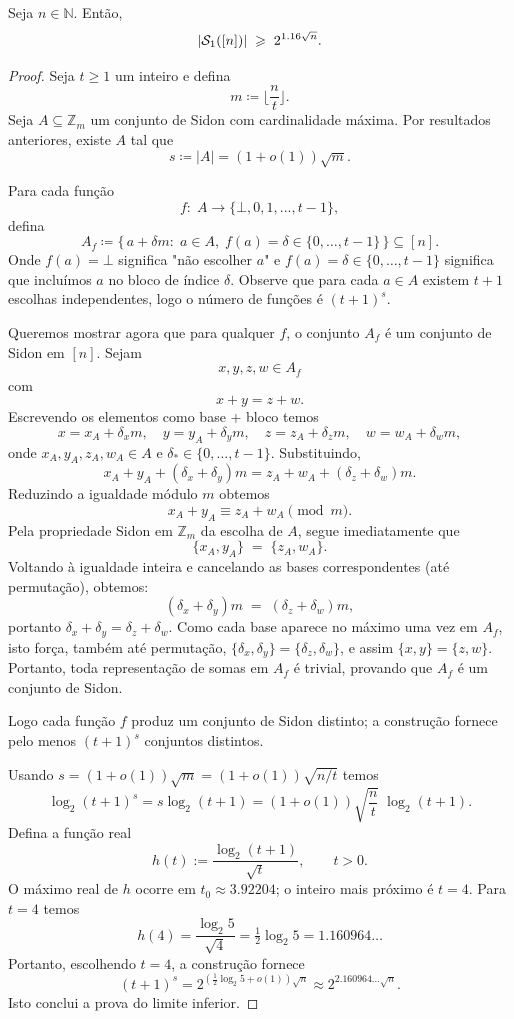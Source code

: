 \documentclass[reqno,a4paper,12pt]{amsart}
\begin{document}
\begin{theorem}
  Seja $n \in \mathbb{N}$. Então,
  \[
    \lvert\mathcal{S}_1([n])\rvert \;\geqslant\; 2^{1.16\sqrt{n}}.
  \]
\end{theorem}
\begin{proof}

  \label{ProofSax}
  Seja $t\geq 1$ um inteiro e defina \[m \coloneqq \Big\lfloor\frac{n}{t}\Big\rfloor.\]
  Seja $A \subseteq \mathbb Z_m$ um conjunto de Sidon com cardinalidade máxima. Por resultados anteriores, existe $A$ tal que \[ s\coloneqq |A|=(1+o(1))\sqrt{m}.\]

  Para cada função \[f : \; A \to \{\bot,0,1,...,t-1\},\]
  defina \[A_f\coloneqq \{\,a+\delta m: \; a\in A,\; f(a)=\delta \in \{0,\dots,t-1\}\,\} \subseteq [n].\]
  Onde $f(a)= \bot$ significa "não escolher $a$" e $f(a)=\delta \in \{0,\dots, t-1\}$ significa que incluímos $a$ no bloco de índice $\delta.$
  Observe que para cada $a \in A$ existem $t+1$ escolhas independentes, logo o número de funções é $(t+1)^s.$

  Queremos mostrar agora que para qualquer $f$, o conjunto $A_f$ é um conjunto de Sidon em $[n]$. Sejam
  \[
    x,y,z,w\in A_f
  \]
  com
  \[
    x+y=z+w.
  \]
  Escrevendo os elementos como base + bloco temos
  \[
    x=x_A+\delta_x m,\quad y=y_A+\delta_y m,\quad z=z_A+\delta_z m,\quad w=w_A+\delta_w m,
  \]
  onde $x_A,y_A,z_A,w_A\in A$ e $\delta_\ast\in\{0,\dots,t-1\}$. Substituindo,
  \[
    x_A+y_A + (\delta_x+\delta_y)m = z_A+w_A + (\delta_z+\delta_w)m.
  \]
  Reduzindo a igualdade módulo $m$ obtemos
  \[
    x_A+y_A\equiv z_A+w_A\pmod m.
  \]
  Pela propriedade Sidon em $\mathbb{Z}_m$ da escolha de $A$, segue imediatamente que
  \[
    \{x_A,y_A\} \;=\; \{z_A,w_A\}.
  \]
  Voltando à igualdade inteira e cancelando as bases correspondentes (até permutação), obtemos:
  \[
    (\delta_x+\delta_y)m \;=\; (\delta_z+\delta_w)m,
  \]
  portanto $\delta_x+\delta_y=\delta_z+\delta_w$. Como cada base aparece no máximo uma vez em $A_f$, isto força, também até permutação, $\{\delta_x, \delta_y\} = \{\delta_z,\delta_w\}$, e assim $\{x,y\} = \{z,w\}$. Portanto, toda representação de somas em $A_f$ é trivial, provando que $A_f$ é um conjunto de Sidon.

  Logo cada função $f$ produz um conjunto de Sidon distinto; a construção fornece pelo menos $(t+1)^s$ conjuntos distintos.

  Usando $s=(1+o(1))\sqrt{m}=(1+o(1))\sqrt{n/t}$ temos
  \[
    \log_2 (t+1)^s = s\log_2(t+1) = (1+o(1))\sqrt{\frac{n}{t}}\;\log_2(t+1).
  \]
  Defina a função real
  \[
    h(t):=\frac{\log_2(t+1)}{\sqrt{t}},\qquad t>0.
  \]
  O máximo real de $h$ ocorre em $t_0\approx 3.92204$; o inteiro mais próximo é $t=4$. Para $t=4$ temos
  \[
    h(4)=\frac{\log_2 5}{\sqrt{4}}=\tfrac12\log_2 5 = 1.160964\ldots
  \]
  Portanto, escolhendo $t=4$, a construção fornece
  \[
    (t+1)^s = 2^{(\tfrac12\log_2 5 + o(1))\sqrt{n}} \approx 2^{2.160964\ldots\sqrt{n}}.
  \]
  Isto conclui a prova do limite inferior.

\end{proof}
\end{document}
